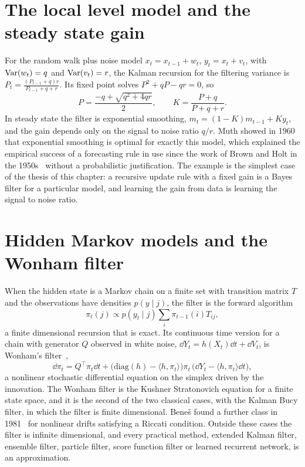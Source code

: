 \section{The local level model and the steady state gain}
\label{sec:local_level}

For the random walk plus noise model $x_t = x_{t-1}+w_t$, $y_t = x_t+v_t$, with $\mathrm{Var}(w_t) = q$ and $\mathrm{Var}(v_t) = r$, the Kalman recursion for the filtering variance is $P_t = \frac{(P_{t-1}+q)r}{P_{t-1}+q+r}$. Its fixed point solves $P^2+qP-qr = 0$, so
\[
P = \frac{-q+\sqrt{q^2+4qr}}{2},\qquad K = \frac{P+q}{P+q+r}.
\]
In steady state the filter is exponential smoothing, $m_t = (1-K)m_{t-1}+Ky_t$, and the gain depends only on the signal to noise ratio $q/r$. Muth showed in 1960~\cite{muth1960} that exponential smoothing is optimal for exactly this model, which explained the empirical success of a forecasting rule in use since the work of Brown and Holt in the 1950s~\cite{brown1959,holt2004,gardner1985} without a probabilistic justification. The example is the simplest case of the thesis of this chapter: a recursive update rule with a fixed gain is a Bayes filter for a particular model, and learning the gain from data is learning the signal to noise ratio.

\section{Hidden Markov models and the Wonham filter}
\label{sec:wonham}

When the hidden state is a Markov chain on a finite set with transition matrix $T$ and the observations have densities $p(y\mid j)$, the filter is the forward algorithm
\[
\pi_t(j)\propto p(y_t\mid j)\sum_i\pi_{t-1}(i)T_{ij},
\]
a finite dimensional recursion that is exact. Its continuous time version for a chain with generator $Q$ observed in white noise, $\dd Y_t = h(X_t)\dd t+\dd V_t$, is Wonham's filter~\cite{wonham1964},
\[
\dd\pi_t = Q^\top\pi_t\dd t+\big(\mathrm{diag}(h)-\langle h,\pi_t\rangle\big)\pi_t\,\big(\dd Y_t-\langle h,\pi_t\rangle\dd t\big),
\]
a nonlinear stochastic differential equation on the simplex driven by the innovation. The Wonham filter is the Kushner Stratonovich equation for a finite state space, and it is the second of the two classical cases, with the Kalman Bucy filter, in which the filter is finite dimensional. Bene\v{s} found a further class in 1981~\cite{benes1981} for nonlinear drifts satisfying a Riccati condition. Outside these cases the filter is infinite dimensional, and every practical method, extended Kalman filter, ensemble filter, particle filter, score function filter or learned recurrent network, is an approximation.

